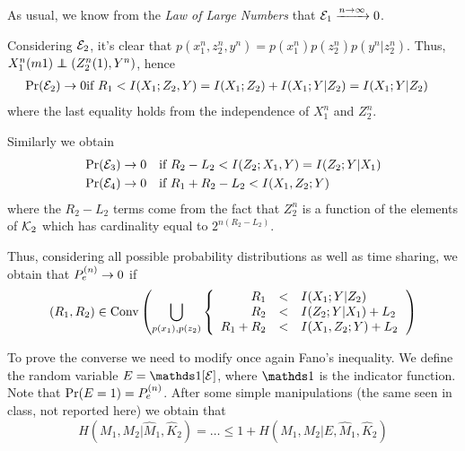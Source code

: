 As usual, we know from the \textit{Law of Large Numbers} that $\mathcal{E}_1 \xrightarrow{n \rightarrow \infty} 0$.

Considering $\mathcal{E}_2$, it's clear that $p(x_1^n,z_2^n,y^n) = p(x_1^n)p(z_2^n)p(y^n|z_2^n)$. Thus, $X_1^n(m1) \independent (Z_2^n(1),Y^n)$, hence
%
\begin{eqnarray}
\Pr(\mathcal{E}_2) \rightarrow 0 & \text{if } R_1 < I(X_1;Z_2,Y) = I(X_1;Z_2) + I(X_1;Y|Z_2) = I(X_1;Y|Z_2)
\end{eqnarray}
%
where the last equality holds from the independence of $X_1^n$ and $Z_2^n$.

Similarly we obtain
%
\begin{align}
\begin{split}
\Pr(\mathcal{E}_3) \rightarrow 0 \quad& \text{if } R_2-L_2 < I(Z_2;X_1,Y) = I(Z_2;Y|X_1)\\
\Pr(\mathcal{E}_4) \rightarrow 0 \quad& \text{if } R_1+R_2-L_2 < I(X_1,Z_2;Y)
\end{split}
\end{align}
%
where the $R_2-L_2$ terms come from the fact that $Z_2^n$ is a function of the elements of $\mathcal{K}_2$ which has cardinality equal to $2^{n(R_2-L_2)}$.

Thus, considering all possible probability distributions as well as time sharing, we obtain that $ P_e^{(n)}  \rightarrow 0$ if
%
\begin{equation}
(R_1,R_2) \in \operatorname{Conv} \qty(\bigcup_{p(x_1),p(z_2)}
\left\{
\begin{array}{rcl}
R_1 &<& I(X_1;Y|Z_2)\\
R_2 &<& I(Z_2;Y|X_1) + L_2\\
R_1+R_2 &<& I(X_1,Z_2;Y) + L_2
\end{array}
\right.
) \label{eq:4.12_achiev_region}
\end{equation}


To prove the converse we need to modify once again Fano's inequality. We define the random variable $E = \indicator[\E]$, where $\indicator$ is the indicator function. Note that $\Pr(E=1) =  P_e^{(n)} $. After some simple manipulations (the same seen in class, not reported here) we obtain that
%
\begin{equation}
H(M_1,M_2|\hat{M}_1,\hat{K}_2) = \ldots \leq 1 + H(M_1,M_2|E,\hat{M}_1,\hat{K}_2)
\end{equation}

